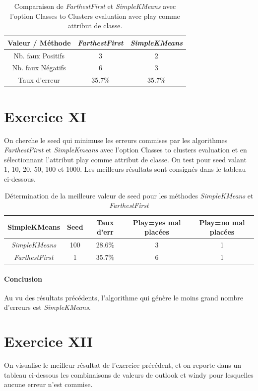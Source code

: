 \documentclass[a4paper, 11pt]{report}
\begin{document}
	\begin{table}[h!]
		\centering
		\begin{tabular}{|c|c|c|}
			\hline
			Valeur / Méthode & \emph{FarthestFirst} & \emph{SimpleKMeans} \\
			\hline
			Nb. faux Positifs & 3 & 2 \\
			\hline
			Nb. faux Négatifs & 6 & 3 \\
			\hline
			Taux d'erreur & 35.7\% & 35.7\% \\
			\hline
		\end{tabular}
		\caption{Comparaison de \emph{FarthestFirst} et \emph{SimpleKMeans} avec l'option Classes to Clusters evaluation avec play comme attribut de classe.}
		\label{tab:exo10}
	\end{table}

	\section{Exercice XI}
	On cherche le seed qui minimuse les erreurs commises par les algorithmes \emph{FarthestFirst} et \emph{SimpleKmeans} avec l'option Classes to clusters evaluation et en sélectionnant l'attribut play comme attribut de classe. On test pour seed valant 1, 10, 20, 50, 100 et 1000. Les meilleurs résultats sont consignés dans le tableau ci-dessous.

	\begin{table}[h!]
		\centering
		\begin{tabular}{|c|c|c|c|c|}
			\hline
			SimpleKMeans & Seed & Taux d'err & Play=yes mal placées & Play=no mal placées \\
			\hline
			\emph{SimpleKMeans} & 100 & 28.6\% & 3 & 1 \\
			\hline
			\emph{FarthestFirst} & 1 & 35.7\% & 6 & 1 \\
			\hline
		\end{tabular}
		\caption{Détermination de la meilleure valeur de seed pour les méthodes \emph{SimpleKMeans} et \emph{FarthestFirst}}
		\label{tab:exo11}
	\end{table}

	\paragraph{Conclusion}Au vu des résultats précédents, l'algorithme qui génère le moins grand nombre d'erreurs est \emph{SimpleKMeans}.

	\section{Exercice XII}
	On visualise le meilleur résultat de l'exercice précédent, et on reporte dans un tableau ci-dessous les combinaisons de valeurs de outlook et windy pour lesquelles aucune erreur n'est commise.
\end{document}
